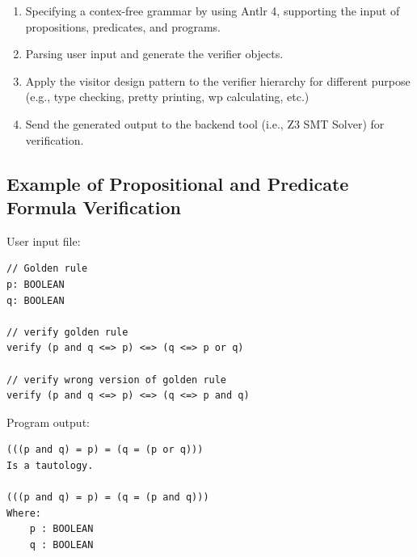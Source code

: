 \documentclass[a0,landscape]{a0poster}
\begin{document}
\begin{multicols}{4}
\begin{enumerate} 
\item Specifying a contex-free grammar by using Antlr 4, supporting the input of propositions, predicates, and programs.
\item Parsing user input and generate the verifier objects. 
\item Apply the visitor design pattern to the verifier hierarchy for different purpose (e.g., type checking, pretty printing, wp calculating, etc.)
\item Send the generated output to the backend tool (i.e., Z3 SMT Solver) for verification.
\end{enumerate}



{\color{Blue} \subsection*{Example of Propositional and Predicate Formula Verification}}
User input file:
\begin{lstlisting}
// Golden rule
p: BOOLEAN
q: BOOLEAN

// verify golden rule
verify (p and q <=> p) <=> (q <=> p or q)

// verify wrong version of golden rule
verify (p and q <=> p) <=> (q <=> p and q)
\end{lstlisting}
Program output:
\begin{lstlisting}
(((p and q) = p) = (q = (p or q)))
Is a tautology.

(((p and q) = p) = (q = (p and q)))
Where: 
    p : BOOLEAN
    q : BOOLEAN


\end{lstlisting}
\end{multicols}
\end{document}
